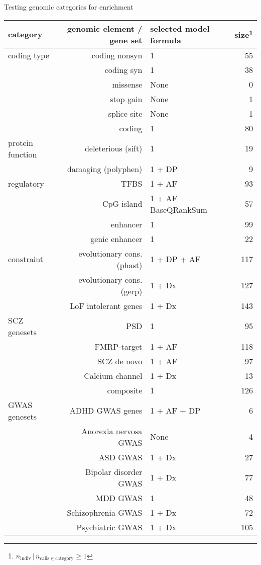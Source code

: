 \documentclass[usenames,dvipsnames]{beamer}
\begin{document}
\begin{frame}{Testing genomic categories for enrichment}
\begin{center}
\tiny
\begin{tabular}{lrlr}
\hline
category & genomic element / gene set & selected model formula & size\footnote{\(n_\mathrm{indiv} \,|\, n_{\mathrm{calls} \in \mathrm{category}} \ge 1\)} \\
\hline
coding type & coding nonsyn & 1 & 55 \\
 & coding syn & 1 & 38 \\
 & missense & None & 0 \\
 & stop gain & None & 1 \\
 & splice site & None & 1 \\
 & coding & 1 & 80 \\
\hline
protein function & deleterious (sift) & 1 & 19 \\
 & damaging (polyphen) & 1 + DP & 9 \\
\hline
regulatory & TFBS & 1 + AF & 93 \\
 & CpG island & 1 + AF + BaseQRankSum & 57 \\
 & enhancer & 1 & 99 \\
 & genic enhancer & 1 & 22 \\
\hline
constraint & evolutionary cons. (phast) & 1 + DP + AF & 117 \\
 & evolutionary cons. (gerp) & 1 + Dx & 127 \\
 & LoF intolerant genes & 1 + Dx & 143 \\
\hline
SCZ genesets & PSD & 1 & 95 \\
 & FMRP-target & 1 + AF & 118 \\
 & SCZ de novo & 1 + AF & 97 \\
 & Calcium channel & 1 + Dx & 13 \\
 & composite & 1 & 126 \\
\hline
GWAS genesets & ADHD GWAS genes & 1 + AF + DP & 6 \\
 & Anorexia nervosa GWAS & None & 4 \\
 & ASD GWAS & 1 + Dx & 27 \\
 & Bipolar disorder GWAS & 1 + Dx & 77 \\
 & MDD GWAS & 1 & 48 \\
 & Schizophrenia GWAS & 1 + Dx & 72 \\
 & Psychiatric GWAS & 1 + Dx & 105 \\
\end{tabular}
\end{center}
\end{frame}
\end{document}
